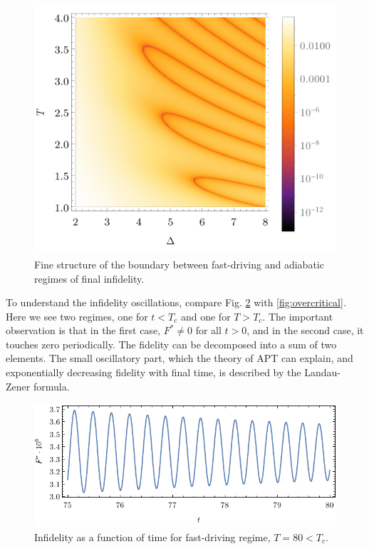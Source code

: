 \vspace{-10pt}\begin{figure}[H]
    \centering 
    \includegraphics[scale=1.2]{../img/dens2Zoom.pdf}
    \caption{Fine structure of the boundary between fast-driving and adiabatic regimes of final infidelity.}
    \label{fig:dens2Zoom}
\end{figure}



To understand the infidelity oscillations, compare Fig. \ref{fig:undercritical} with \ref{fig:overcritical}. Here we see two regimes, one for $t<T_c$ and one for $T>T_c$. The important observation is that in the first case, $F^*\neq 0$ for all $t>0$, and in the second case, it touches zero periodically. The fidelity can be decomposed into a sum of two elements. The small oscillatory part, which the theory of APT can explain, and exponentially decreasing fidelity with final time, is described by the Landau-Zener formula.

\begin{figure}[H]
    \centering
    \includegraphics[scale=1.2]{../img/undercritical.pdf}
    \caption{Infidelity as a function of time for fast-driving regime, $T=80<T_c$.}
    \label{fig:undercritical}
\end{figure}

